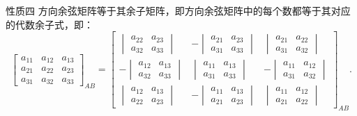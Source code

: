 \begin{myTheorem}{性质四}
    方向余弦矩阵等于其余子矩阵，即方向余弦矩阵中的每个数都等于其对应的代数余子式，即：
    \begin{equation}
        \begin{bmatrix}a_{11}&a_{12}&a_{13}\\a_{21}&a_{22}&a_{23}\\a_{31}&a_{32}&a_{33}\end{bmatrix}_{AB}=\begin{bmatrix}\begin{vmatrix}a_{22}&a_{23}\\a_{32}&a_{33}\end{vmatrix}&-\begin{vmatrix}a_{21}&a_{23}\\a_{31}&a_{33}\end{vmatrix}&\begin{vmatrix}a_{21}&a_{22}\\a_{31}&a_{32}\end{vmatrix}\\-\begin{vmatrix}a_{12}&a_{13}\\a_{32}&a_{33}\end{vmatrix}&\begin{vmatrix}a_{11}&a_{13}\\a_{31}&a_{33}\end{vmatrix}&-\begin{vmatrix}a_{11}&a_{12}\\a_{31}&a_{32}\end{vmatrix}\\\begin{vmatrix}a_{12}&a_{13}\\a_{22}&a_{23}\end{vmatrix}&-\begin{vmatrix}a_{11}&a_{13}\\a_{21}&a_{23}\end{vmatrix}&\begin{vmatrix}a_{11}&a_{12}\\a_{21}&a_{22}\end{vmatrix}\end{bmatrix}_{AB}.
    \end{equation}
\end{myTheorem}

